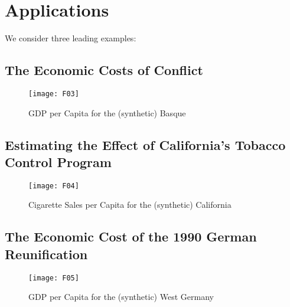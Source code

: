 \section{Applications}
We consider three leading examples:


\subsection{The Economic Costs of Conflict}
\cite{abadie:2003}
\begin{figure}[H]
	\centering
	\texttt{[image: F03]}
	\caption{GDP per Capita for the (synthetic) Basque}
	\label{F_03}
\end{figure}

\newpage
\subsection{Estimating the Effect of California’s Tobacco Control Program}
\cite{abadie:2010}
\begin{figure}[H]
	\centering
	\texttt{[image: F04]}
	\caption{Cigarette Sales per Capita for the (synthetic) California}
	\label{F_04}
\end{figure}

\newpage
\subsection{The Economic Cost of the 1990 German Reunification}
\cite{abadie:2015}
\begin{figure}[H]
	\centering
	\texttt{[image: F05]}
	\caption{GDP per Capita for the (synthetic) West Germany}
	\label{F_05}
\end{figure}